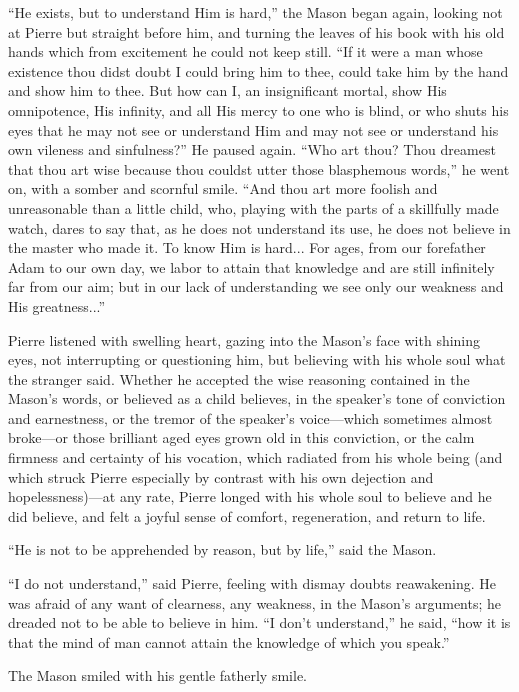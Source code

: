 ``He exists, but to understand Him is hard,'' the Mason began
again, looking not at Pierre but straight before him, and turning
the leaves of his book with his old hands which from excitement
he could not keep still. ``If it were a man whose existence thou
didst doubt I could bring him to thee, could take him by the hand
and show him to thee. But how can I, an insignificant mortal,
show His omnipotence, His infinity, and all His mercy to one who
is blind, or who shuts his eyes that he may not see or understand
Him and may not see or understand his own vileness and
sinfulness?'' He paused again. ``Who art thou? Thou dreamest that
thou art wise because thou couldst utter those blasphemous
words,'' he went on, with a somber and scornful smile. ``And thou
art more foolish and unreasonable than a little child, who,
playing with the parts of a skillfully made watch, dares to say
that, as he does not understand its use, he does not believe in
the master who made it. To know Him is hard... For ages, from our
forefather Adam to our own day, we labor to attain that knowledge
and are still infinitely far from our aim; but in our lack of
understanding we see only our weakness and His greatness...''

Pierre listened with swelling heart, gazing into the Mason's face
with shining eyes, not interrupting or questioning him, but
believing with his whole soul what the stranger said. Whether he
accepted the wise reasoning contained in the Mason's words, or
believed as a child believes, in the speaker's tone of conviction
and earnestness, or the tremor of the speaker's voice---which
sometimes almost broke---or those brilliant aged eyes grown old
in this conviction, or the calm firmness and certainty of his
vocation, which radiated from his whole being (and which struck
Pierre especially by contrast with his own dejection and
hopelessness)---at any rate, Pierre longed with his whole soul to
believe and he did believe, and felt a joyful sense of comfort,
regeneration, and return to life.

``He is not to be apprehended by reason, but by life,'' said the
Mason.

``I do not understand,'' said Pierre, feeling with dismay doubts
reawakening. He was afraid of any want of clearness, any
weakness, in the Mason's arguments; he dreaded not to be able to
believe in him. ``I don't understand,'' he said, ``how it is that
the mind of man cannot attain the knowledge of which you speak.''

The Mason smiled with his gentle fatherly smile.

